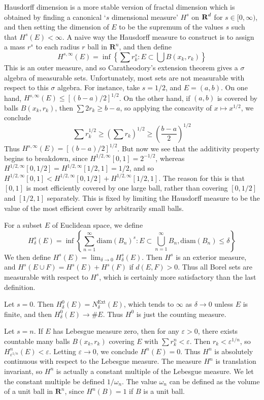 Hausdorff dimension is a more stable version of fractal dimension which is obtained by finding a canonical `$s$ dimensional measure' $H^s$ on $\operatorname{\mathbf{R}}^d$ for $s \in [0,\infty)$, and then setting the dimension of $E$ to be the supremum of the values $s$ such that $H^s(E) < \infty$. A naive way the Hausdorff measure to construct is to assign a mass $r^s$ to each radius $r$ ball in $\mathbf{R}^n$, and then define
%
\[ H^{s,\infty}(E) = \inf \left\{ \sum r_k^s : E \subset \bigcup B(x_k,r_k) \right\} \]
%
This is an outer measure, and so Caratheodory's extension theorem gives a $\sigma$ algebra of measurable sets. Unfortunately, most sets are not measurable with respect to this $\sigma$ algebra. For instance, take $s = 1/2$, and $E = (a,b)$. On one hand, $H^{s,\infty}(E) \leq [(b-a)/2]^{1/2}$. On the other hand, if $(a,b)$ is covered by balls $B(x_k,r_k)$, then $\sum 2r_k \geq b - a$, so applying the concavity of $x \mapsto x^{1/2}$, we conclude
%
\[ \sum r_k^{1/2} \geq \left( \sum r_k \right)^{1/2} \geq \left( \frac{b - a}{2} \right)^{1/2} \]
%
Thus $H^{s,\infty}(E) = [(b-a)/2]^{1/2}$. But now we see that the additivity property begins to breakdown, since $H^{1/2,\infty}[0,1] = 2^{-1/2}$, whereas $H^{1/2,\infty}[0,1/2] = H^{1/2,\infty}[1/2,1] = 1/2$, and so $H^{1/2,\infty}[0,1] < H^{1/2,\infty}[0,1/2] + H^{1/2,\infty}[1/2,1]$. The reason for this is that $[0,1]$ is most efficiently covered by one large ball, rather than covering $[0,1/2]$ and $[1/2,1]$ separately. This is fixed by limiting the Hausdorff measure to be the value of the most efficient cover by arbitrarily small balls.

For a subset $E$ of Euclidean space, we define
%
\[ H_\delta^s(E) = \inf \left\{ \sum_{n = 1}^\infty \text{diam}(B_n)^s : E \subset \bigcup_{n = 1}^\infty B_n, \text{diam}(B_n) \leq \delta \right\} \]
%
We then define $H^s(E) = \lim_{\delta \to 0} H_\delta^s(E)$. Then $H^s$ is an exterior measure, and $H^s(E \cup F) = H^s(E) + H^s(F)$ if $d(E,F) > 0$. Thus all Borel sets are measurable with respect to $H^s$, which is certainly more satisfactory than the last definition.

\begin{example}
	Let $s = 0$. Then $H_\delta^0(E) = N_\delta^{\text{Ext}}(E)$, which tends to $\infty$ as $\delta \to 0$ unless $E$ is finite, and then $H_\delta^0(E) \to \# E$. Thus $H^0$ is just the counting measure.
\end{example}

\begin{example}
	Let $s = n$. If $E$ has Lebesgue measure zero, then for any $\varepsilon > 0$, there exists countable many balls $B(x_k,r_k)$ covering $E$ with $\sum r_k^n < \varepsilon$. Then $r_k < \varepsilon^{1/n}$, so $H^n_{\varepsilon^{1/n}}(E) < \varepsilon$. Letting $\varepsilon \to 0$, we conclude $H^n(E) = 0$. Thus $H^n$ is absolutely continuous with respect to the Lebesgue measure. The measure $H^n$ is translation invariant, so $H^n$ is actually a constant multiple of the Lebesgue measure. We let the constant multiple be defined $1/\omega_n$. The value $\omega_n$ can be defined as the volume of a unit ball in $\mathbf{R}^n$, since $H^n(B) = 1$ if $B$ is a unit ball.
\end{example}

